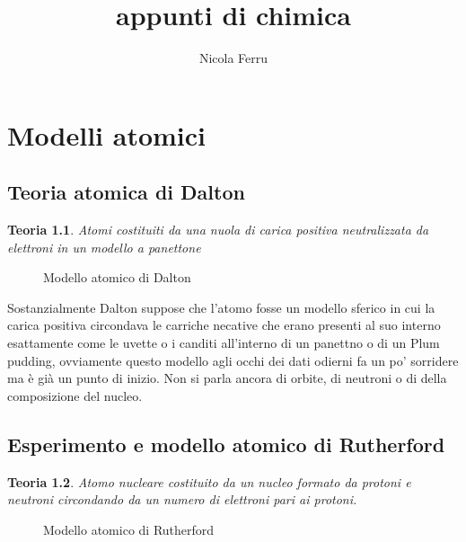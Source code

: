 \documentclass{book}
\title{appunti di chimica}
\author{Nicola Ferru}
\newtheorem{tteor}{Teoria}[section]
\begin{document}

\tableofcontents



\chapter{Modelli atomici}
\label{chap:modAtom}

\section{Teoria atomica di Dalton}
\label{sec:teoriaatomdidalton}
\begin{tteor}
  Atomi costituiti da una nuola di carica positiva neutralizzata da elettroni in un modello a panettone
\end{tteor}
\begin{figure}[ht!]
  \centering
  
  \caption{Modello atomico di Dalton}
  \label{fig:modatomDalton}
\end{figure}
Sostanzialmente Dalton suppose che l'atomo fosse un modello sferico in cui la carica positiva circondava
le carriche necative che erano presenti al suo interno esattamente come le uvette o i canditi
all'interno di un panettno o di un Plum pudding, ovviamente questo modello agli occhi dei dati odierni
fa un po' sorridere ma è già un punto di inizio. Non si parla ancora di orbite, di neutroni o di della
composizione del nucleo.

\section{Esperimento e modello atomico di Rutherford}
\label{sec:rutherford}

\begin{tteor}
  Atomo nucleare costituito da un nucleo formato da protoni e neutroni circondando da un numero di
  elettroni pari ai protoni.
\end{tteor}
\begin{figure}[ht!]
  \centering
  
  \caption{Modello atomico di Rutherford}
  \label{fig:modatomRutherford}
\end{figure}
\end{document}
